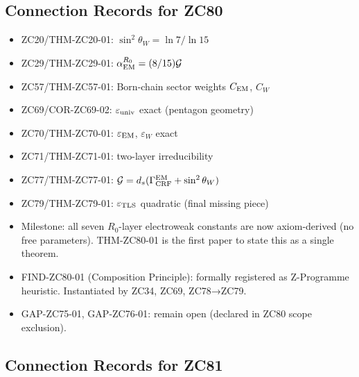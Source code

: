 \documentclass[12pt, a4paper]{article}
\begin{document}
\subsection{Connection Records for ZC80}

\begin{inheritbox}[title={ZC80 --- Backward Inheritance from Parts A--I}]
\begin{itemize}[noitemsep, leftmargin=1.5em]
  \item ZC20/THM-ZC20-01: $\sin^2\theta_W = \ln7/\ln15$
  \item ZC29/THM-ZC29-01: $\alpha_{\rm EM}^{R_0} = (8/15)\mathcal{G}$
  \item ZC57/THM-ZC57-01: Born-chain sector weights $C_{\rm EM}$, $C_W$
  \item ZC69/COR-ZC69-02: $\varepsilon_{\rm univ}$ exact (pentagon geometry)
  \item ZC70/THM-ZC70-01: $\varepsilon_{\rm EM}$, $\varepsilon_W$ exact
  \item ZC71/THM-ZC71-01: two-layer irreducibility
  \item ZC77/THM-ZC77-01: $\mathcal{G} = d_s(\Gamma_{\rm CRF}^{\rm EM} + \sin^2\theta_W)$
  \item ZC79/THM-ZC79-01: $\varepsilon_{\rm TLS}$ quadratic (final missing piece)
\end{itemize}
\end{inheritbox}

\begin{correctionbox}[title={ZC80 --- Forward Corrections / Milestone}]
\begin{itemize}[noitemsep, leftmargin=1.5em]
  \item Milestone: all seven $R_0$-layer electroweak constants are
    now axiom-derived (no free parameters). THM-ZC80-01 is the
    first paper to state this as a single theorem.
  \item FIND-ZC80-01 (Composition Principle): formally registered
    as Z-Programme heuristic. Instantiated by ZC34, ZC69, ZC78→ZC79.
  \item GAP-ZC75-01, GAP-ZC76-01: remain open (declared in ZC80
    scope exclusion).
\end{itemize}
\end{correctionbox}

\subsection{Connection Records for ZC81}
\end{document}
